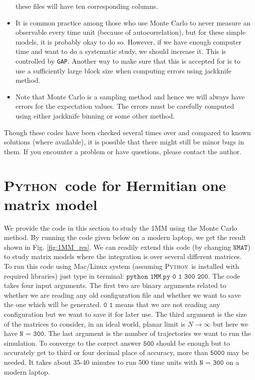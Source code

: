 \documentclass[letter,11pt]{article}
\newcommand{\PY}{\textsc{Python}}
\begin{document}
\begin{itemize}
these files will have ten corresponding columns. 
\item It is common practice among those who use Monte Carlo to never measure an 
observable every time unit (because of autocorrelation), but for these simple models, it is probably okay to do so. However, if we
have enough computer time and want to do a systematic study, we should increase it. This is controlled by \texttt{GAP}. Another way to make sure that this is accepted for is to use a sufficiently large block size when computing errors using jackknife method. 
\item Note that Monte Carlo is a sampling method and hence we will always have errors for the expectation values. The errors must be carefully computed using either jackknife binning or some other method. 
\end{itemize} 
Though these codes have been checked several times over and compared to known solutions (where available), it is possible that there might still be minor bugs in them. If you encounter a problem or have questions, please contact the author. 
\section{\label{sec:1MMPYC}\PY~code for Hermitian one matrix model}
We provide the code in this section to study the 1MM using the Monte Carlo method. By running the code given below
on a modern laptop, we get the result shown in 
Fig. \ref{fig:1MM_res}. We can readily extend this code (by changing $\texttt{NMAT}$) to study matrix models where the integration is over several different matrices. 
To run this code using Mac/Linux system (assuming  \PY~is installed with required libraries) just type in terminal: 
$\texttt{python 1MM.py 0 1 300 200}$. The code takes four input arguments. The first two are binary arguments
related to whether we are reading any old configuration file and whether we want to save the one which will be 
generated. $\texttt{0 1}$ means that we are not reading any configuration but we want to save it for later use. 
The third argument is the size of the matrices to consider, in an ideal world, planar limit is $ N \to \infty$ but here
we have $\texttt{N = 300}$. The last argument is the 
number of trajectories we want to run the simulation. 
To converge to the correct answer $\texttt{500}$ should be enough but to accurately 
get to third or four decimal place of accuracy, 
more than $\texttt{5000}$ may be needed. 
It takes about 35-40 minutes to run 500 time units 
with $\texttt{N = 300}$ on a modern laptop. 
\begin{mdframed}[backgroundcolor=mauve!3] 

\end{mdframed} 
\end{document}
